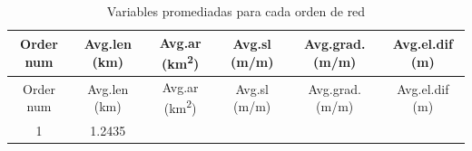 \documentclass[11pt,]{article}
\begin{document}
\begin{longtable}[]{@{}cccccc@{}}
\caption{\label{promo} Variables promediadas para cada orden de
red}\tabularnewline
\toprule
\begin{minipage}[b]{0.08\columnwidth}\centering\strut
Order num\strut
\end{minipage} & \begin{minipage}[b]{0.11\columnwidth}\centering\strut
Avg.len (km)\strut
\end{minipage} & \begin{minipage}[b]{0.25\columnwidth}\centering\strut
Avg.ar (km\textsuperscript{2})\strut
\end{minipage} & \begin{minipage}[b]{0.11\columnwidth}\centering\strut
Avg.sl (m/m)\strut
\end{minipage} & \begin{minipage}[b]{0.14\columnwidth}\centering\strut
Avg.grad. (m/m)\strut
\end{minipage} & \begin{minipage}[b]{0.13\columnwidth}\centering\strut
Avg.el.dif (m)\strut
\end{minipage}\tabularnewline
\midrule
\endfirsthead
\toprule
\begin{minipage}[b]{0.08\columnwidth}\centering\strut
Order num\strut
\end{minipage} & \begin{minipage}[b]{0.11\columnwidth}\centering\strut
Avg.len (km)\strut
\end{minipage} & \begin{minipage}[b]{0.25\columnwidth}\centering\strut
Avg.ar (km\textsuperscript{2})\strut
\end{minipage} & \begin{minipage}[b]{0.11\columnwidth}\centering\strut
Avg.sl (m/m)\strut
\end{minipage} & \begin{minipage}[b]{0.14\columnwidth}\centering\strut
Avg.grad. (m/m)\strut
\end{minipage} & \begin{minipage}[b]{0.13\columnwidth}\centering\strut
Avg.el.dif (m)\strut
\end{minipage}\tabularnewline
\midrule
\endhead
\begin{minipage}[t]{0.08\columnwidth}\centering\strut
1\strut
\end{minipage} & \begin{minipage}[t]{0.11\columnwidth}\centering\strut
1.2435\strut
\end{minipage} & \begin{minipage}[t]{0.25\columnwidth}\centering\strut

\end{minipage}
\end{longtable}
\end{document}
